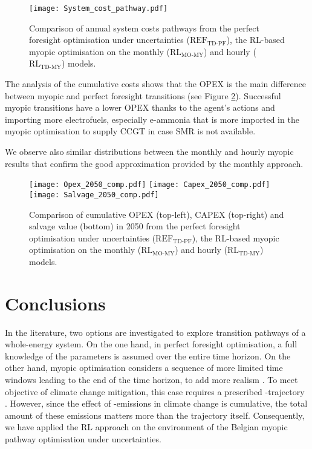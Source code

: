 \begin{figure}[!htbp]
\centering
\texttt{[image: System\_cost\_pathway.pdf]}
\caption{Comparison of annual system costs pathways from the perfect foresight optimisation under uncertainties ($\text{REF}_{\text{TD-PF}}$), the \gls{RL}-based myopic optimisation on the monthly ($\text{RL}_{\text{MO-MY}}$) and hourly ($\text{RL}_{\text{TD-MY}}$) models.}
\label{fig:System_cost_pathway}
\end{figure}

The analysis of the cumulative costs shows that the \gls{OPEX} is the main difference between myopic and perfect foresight transitions (see Figure \ref{fig:Opex_Capex_Salvage_comp}). Successful myopic transitions have a lower \gls{OPEX} thanks to the agent's actions and importing more electrofuels, especially e-ammonia that is more imported in the myopic optimisation to supply \gls{CCGT} in case \gls{SMR} is not available.

We observe also similar distributions between the monthly and hourly myopic results that confirm the good approximation provided by the monthly approach.

\begin{figure}[!htbp]
\centering
\texttt{[image: Opex\_2050\_comp.pdf]}
\texttt{[image: Capex\_2050\_comp.pdf]}
\texttt{[image: Salvage\_2050\_comp.pdf]}
\caption{Comparison of cumulative OPEX (top-left), CAPEX (top-right) and salvage value (bottom) in 2050 from the perfect foresight optimisation under uncertainties ($\text{REF}_{\text{TD-PF}}$), the \gls{RL}-based myopic optimisation on the monthly ($\text{RL}_{\text{MO-MY}}$) and hourly ($\text{RL}_{\text{TD-MY}}$) models.}
\label{fig:Opex_Capex_Salvage_comp}
\end{figure}

\section{Conclusions}
\label{sec:RL:conclusions}
In the literature, two options are investigated to explore transition pathways of a whole-energy system. On the one hand, in perfect foresight optimisation, a full knowledge of the parameters is assumed over the entire time horizon. On the other hand, myopic optimisation considers a sequence of more limited time windows leading to the end of the time horizon, to add more realism \cite{poncelet2016myopic}. To meet objective of climate change mitigation, this case requires a prescribed -trajectory \cite{fais2016impact}. However, since the effect of -emissions in climate change is cumulative, the total amount of these emissions matters more than the trajectory itself. Consequently, we have applied the \acrfull{RL} approach on the environment of the Belgian myopic pathway optimisation under uncertainties.

